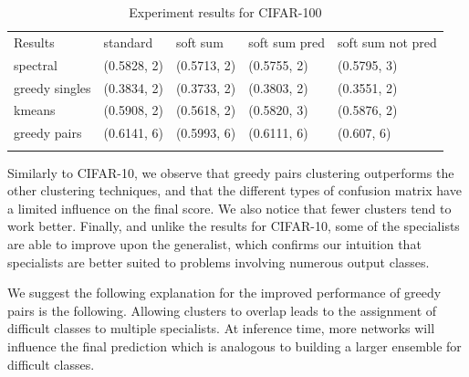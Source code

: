 \documentclass[12pt]{article}
\begin{document}


\begin{longtable}[c]{@{}lllll@{}}
\toprule\addlinespace
Results & standard & soft sum & soft sum pred & soft sum not pred
\\\addlinespace
\midrule\endhead
spectral & (0.5828, 2) & (0.5713, 2) & (0.5755, 2) & (0.5795, 3)
\\\addlinespace
greedy singles & (0.3834, 2) & (0.3733, 2) & (0.3803, 2) & (0.3551, 2)
\\\addlinespace
kmeans & (0.5908, 2) & (0.5618, 2) & (0.5820, 3) & (0.5876, 2)
\\\addlinespace
greedy pairs & (0.6141, 6) & (0.5993, 6) & (0.6111, 6) & (0.607, 6)
\\\addlinespace
\bottomrule
\addlinespace
\caption{Experiment results for CIFAR-100}
\end{longtable}

Similarly to CIFAR-10, we observe that greedy pairs clustering
outperforms the other clustering techniques, and that the different
types of confusion matrix have a limited influence on the final score.
We also notice that fewer clusters tend to work better. Finally, and
unlike the results for CIFAR-10, some of the specialists are able to
improve upon the generalist, which confirms our intuition that
specialists are better suited to problems involving numerous output
classes.

We suggest the following explanation for the improved performance of
greedy pairs is the following. Allowing clusters to overlap leads to the
assignment of difficult classes to multiple specialists. At inference
time, more networks will influence the final prediction which is
analogous to building a larger ensemble for difficult classes.
\end{document}
